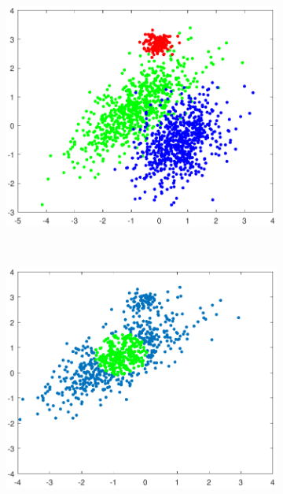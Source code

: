 \documentclass[preprint,12pt]{elsarticle}
\begin{document}
\begin{figure}[!htb]
	\centering
	\begin{subfigure}[b]{0.4\linewidth}
		\centering\includegraphics[width=1\linewidth]{figures/kcstep/datamodel.pdf}
		\caption{\label{fig:dmodel}} 
	\end{subfigure} \\
	\begin{subfigure}[b]{0.40\linewidth}
		\centering\includegraphics[width=1\linewidth]{figures/kcstep/c1input.pdf}
		\caption{\label{fig:spatialmedc1}}
	\end{subfigure}

\end{figure}
\end{document}
